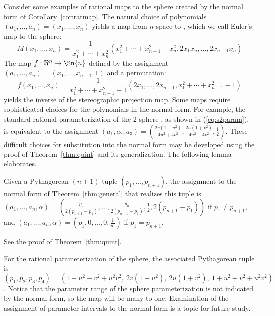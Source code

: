 \documentclass[11pt]{article}
\begin{document}
Consider some examples of rational maps to the sphere created by the normal form
of Corollary~\ref{cor:ratmap}.
The natural choice of polynomials $(a_1,\ldots,a_n) = (x_1,\ldots,x_n)$ yields a map from
$n$-space to , which we call Euler's map to the sphere:
\begin{equation}
\label{eq:euler}
  M(x_1,\ldots,x_n) = \frac{1}{x_1^2 + \cdots + x_n^2} 
  (x_1^2 + \cdots + x_{n-1}^2 - x_n^2, 2x_1x_n, \ldots, 2x_{n-1}x_n)
\end{equation}
%
%
The map $f: \Re^n \rightarrow \Sn{n}$ defined by the assignment 
$(a_1,\ldots,a_n) = (x_1,\ldots,x_{n-1},1)$ and a permutation:
\[
f(x_1,\ldots,x_n) = \frac{1}{x_1^2 + \cdots + x_{n-1}^2 + 1}
   (2x_1, \ldots, 2x_{n-1}, x_1^2 + \cdots + x_{n-1}^2 - 1)
\]
yields the inverse of the stereographic projection map.
%
Some maps require sophisticated choices for the polynomials in the normal form.
For example, the standard rational parameterization of the 2-sphere , 
as shown in (\ref{eq:s2param}),
is equivalent to the assignment 
$(a_1,a_2,a_3) = (\frac{2v(1-u^2)}{4u^2+4v^2},
                  \frac{2u(1+v^2)}{4u^2+4v^2},
                  \frac{1}{2})$.
These difficult choices for substitution into the normal form may be developed using
the proof of Theorem~\ref{thm:quint} and its generalization.
The following lemma elaborates.

\begin{lemma}
Given a Pythagorean $(n+1)$-tuple $(p_1,\ldots,p_{n+1})$,
the assignment to the normal form of Theorem~\ref{thm:general} that realizes this tuple 
is $(a_1,\ldots,a_n,\alpha) = 
    (\frac{p_2}{2(p_{n+1}-p_1)},\ldots,
     \frac{p_n}{2(p_{n+1}-p_1)},
     \frac{1}{2},
                2(p_{n+1}-p_1) )$
if $p_1 \neq p_{n+1}$,
and $(a_1,\ldots,a_n,\alpha) = (p_1,0,\ldots,0,\frac{1}{p_1})$ if $p_1 = p_{n+1}$.
\end{lemma}
\prf
See the proof of Theorem~\ref{thm:quint}.
\QED

For the rational parameterization of the sphere, the associated Pythagorean tuple is
$(p_1,p_2,p_3,p_4) = (1-u^2-v^2+u^2v^2,\ 2v(1-u^2),\ 2u(1+v^2),\ 1+u^2+v^2+u^2v^2)$.
Notice that the parameter range of the sphere parameterization is not indicated
by the normal form, so the map will be many-to-one.
Examination of the assignment of parameter intervals to the normal form is a topic
for future study.

\end{document}
